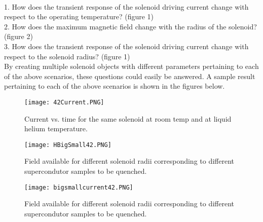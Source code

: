 \documentclass[prb,preprint]{revtex4-1}
\begin{document}
\\
1.  How does the transient response of the solenoid driving current change with respect to the operating temperature? (figure 1) 
\\
2.  How does the maximum magnetic field change with the radius of the solenoid? (figure 2) 
\\
3.  How does the transient response of the solenoid driving current change with respect to the solenoid radius? (figure 1) 
\\
By creating multiple solenoid objects with different parameters pertaining to each of the above scenarios, these questions could easily be answered.  A sample result pertaining to each of the above scenarios is shown in the figures below.

\begin{figure}[page]
\centering
\texttt{[image: 42Current.PNG]}
\caption{Current vs. time for the same solenoid at room temp and at liquid helium temperature.}
\label{sunsets}
\end{figure}
\begin{figure}[h!]
\centering
\texttt{[image: HBigSmall42.PNG]}
\caption{Field available for different solenoid radii corresponding to different supercondutor samples to be quenched.}
\label{sunsets}
\end{figure}
\begin{figure}[h!]
\centering
\texttt{[image: bigsmallcurrent42.PNG]}
\caption{Field available for different solenoid radii corresponding to different supercondutor samples to be quenched.}
\label{sunsets}
\end{figure}
\end{document}

